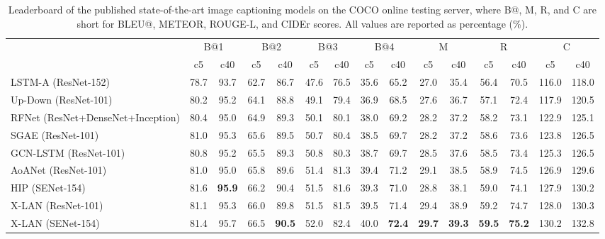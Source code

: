\documentclass[10pt,twocolumn,letterpaper]{article}
\begin{document}
\begin{table*}[!tb]\scriptsize
\centering
  \caption{\small Leaderboard of the published state-of-the-art image captioning models on the COCO online testing server, where B@, M, R, and C are short for BLEU@, METEOR, ROUGE-L, and CIDEr scores. All values are reported as percentage (\%).}
  \label{table:leaderboard}
  \vspace{-0.00in}
  \begin{tabular}{l|*{13}{c|}c}
  \Xhline{2\arrayrulewidth}
      \multicolumn{1}{c|}{\multirow{2}{*}{{Model}}} & \multicolumn{2}{c|}{{B@1}} & \multicolumn{2}{c|}{{B@2}} & \multicolumn{2}{c|}{{B@3}} & \multicolumn{2}{c|}{{B@4}} & \multicolumn{2}{c|}{{M}} & \multicolumn{2}{c|}{{R}} & \multicolumn{2}{c}{{C}} \\\cline{2-15}
      \multicolumn{1}{c|}{}&c5 &c40 &c5 &c40 &c5 &c40&c5 &c40&c5 &c40&c5 &c40&c5 &c40 \\\hline
       {LSTM-A} (ResNet-152) \cite{yao2017boosting}     & 78.7 & 93.7 & 62.7 & 86.7 & 47.6 & 76.5 & 35.6 & 65.2 & 27.0 & 35.4 & 56.4 & 70.5 & 116.0 & 118.0  \\\hline
	    {Up-Down} (ResNet-101) \cite{anderson2017bottom} & 80.2 & 95.2 & 64.1 & 88.8 & 49.1 & 79.4 & 36.9 & 68.5 & 27.6 & 36.7 & 57.1 & 72.4 & 117.9 & 120.5  \\\hline
      {RFNet} (ResNet+DenseNet+Inception) \cite{jiang2018recurrent}  & 80.4 & 95.0 & 64.9 & 89.3 & 50.1 & 80.1 & 38.0 & 69.2 & 28.2 & 37.2 & 58.2 & 73.1 & 122.9 & 125.1 \\\hline
			{SGAE} (ResNet-101) \cite{Yang:CVPR19}           & 81.0 & 95.3 & 65.6 & 89.5 & 50.7 & 80.4 & 38.5 & 69.7 & 28.2 & 37.2 & 58.6 & 73.6 & 123.8 & 126.5 \\\hline
			{GCN-LSTM} (ResNet-101) \cite{yao2018exploring}  & 80.8 & 95.2 & 65.5 & 89.3 & 50.8 & 80.3 & 38.7 & 69.7 & 28.5 & 37.6 & 58.5 & 73.4 & 125.3 & 126.5 \\\hline
			{AoANet} (ResNet-101) \cite{huang2019attentio}   & 81.0 & 95.0 & 65.8 & 89.6 & 51.4 & 81.3 & 39.4 & 71.2 & 29.1 & 38.5 & 58.9 & 74.5 & 126.9 & 129.6 \\\hline
			{HIP (SENet-154) \cite{yao2019hierarchy}}                    & 81.6 & \textbf{95.9} & 66.2 & 90.4 & 51.5 & 81.6 & 39.3 & 71.0 & 28.8 & 38.1 & 59.0 & 74.1 & 127.9 & 130.2 \\\hline
			{X-LAN (ResNet-101)}                & 81.1 & 95.3 & 66.0 & 89.8 & 51.5 & 81.5 & 39.5 & 71.4 & 29.4 & 38.9 & 59.2 & 74.7 & 128.0 & 130.3 \\\hline
            {X-LAN (SENet-154)}                 & 81.4 & 95.7 & 66.5 & \textbf{90.5} & 52.0 & 82.4 & 40.0 & \textbf{72.4} & \textbf{29.7} & \textbf{39.3} & \textbf{59.5} & \textbf{75.2} & 130.2 & 132.8 \\\hline

\end{tabular}
\end{table*}
\end{document}
